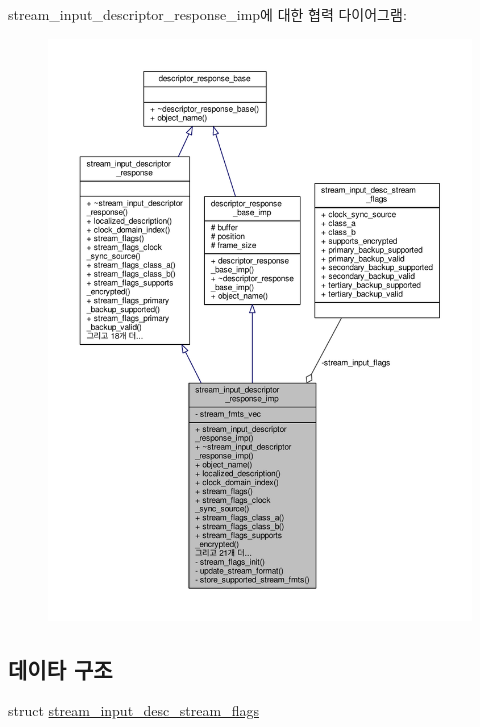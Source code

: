 stream\+\_\+input\+\_\+descriptor\+\_\+response\+\_\+imp에 대한 협력 다이어그램\+:
\nopagebreak
\begin{figure}[H]
\begin{center}
\leavevmode
\includegraphics[width=350pt]{classavdecc__lib_1_1stream__input__descriptor__response__imp__coll__graph}
\end{center}
\end{figure}
\subsection*{데이타 구조}
\begin{DoxyCompactItemize}
\item 
struct \hyperlink{structavdecc__lib_1_1stream__input__descriptor__response__imp_1_1stream__input__desc__stream__flags}{stream\+\_\+input\+\_\+desc\+\_\+stream\+\_\+flags}
\end{DoxyCompactItemize}
